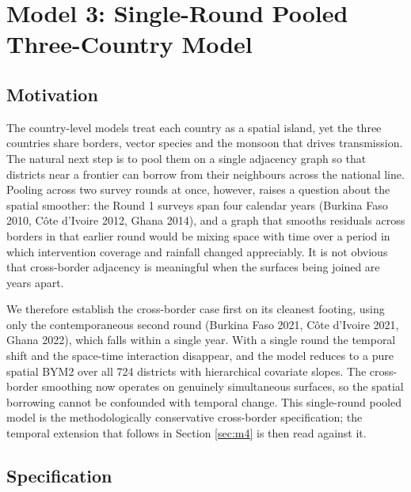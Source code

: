 \documentclass{article}
\begin{document}
\section{Model 3: Single-Round Pooled Three-Country Model}\label{sec:m3}

\subsection{Motivation}\label{motivation}

The country-level models treat each country as a spatial island, yet the
three countries share borders, vector species and the monsoon that
drives transmission. The natural next step is to pool them on a single
adjacency graph so that districts near a frontier can borrow from their
neighbours across the national line. Pooling across two survey rounds at
once, however, raises a question about the spatial smoother: the Round 1
surveys span four calendar years (Burkina Faso 2010, Côte d'Ivoire 2012,
Ghana 2014), and a graph that smooths residuals across borders in that
earlier round would be mixing space with time over a period in which
intervention coverage and rainfall changed appreciably. It is not
obvious that cross-border adjacency is meaningful when the surfaces
being joined are years apart.

We therefore establish the cross-border case first on its cleanest
footing, using only the contemporaneous second round (Burkina Faso 2021,
Côte d'Ivoire 2021, Ghana 2022), which falls within a single year. With
a single round the temporal shift and the space-time interaction
disappear, and the model reduces to a pure spatial BYM2 over all 724
districts with hierarchical covariate slopes. The cross-border smoothing
now operates on genuinely simultaneous surfaces, so the spatial
borrowing cannot be confounded with temporal change. This single-round
pooled model is the methodologically conservative cross-border
specification; the temporal extension that follows in Section
\ref{sec:m4} is then read against it.

\subsection{Specification}\label{specification-2}
\end{document}

